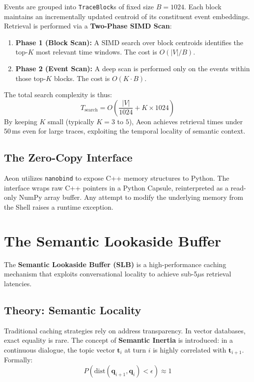\documentclass[10pt,twocolumn]{article}
\begin{document}
Events are grouped into \texttt{TraceBlock}s of fixed size $B=1024$. Each block maintains an incrementally updated centroid of its constituent event embeddings. Retrieval is performed via a \textbf{Two-Phase SIMD Scan}:
\begin{enumerate}
    \item \textbf{Phase 1 (Block Scan):} A SIMD search over block centroids identifies the top-$K$ most relevant time windows. The cost is $O(|V|/B)$.
    \item \textbf{Phase 2 (Event Scan):} A deep scan is performed only on the events within those top-$K$ blocks. The cost is $O(K \cdot B)$.
\end{enumerate}
The total search complexity is thus:
\begin{equation}
    T_{\text{search}} = O\left(\frac{|V|}{1024} + K \times 1024\right)
\end{equation}
By keeping $K$ small (typically $K=3$ to $5$), Aeon achieves retrieval times under 50\,ms even for large traces, exploiting the temporal locality of semantic context.

\subsection{The Zero-Copy Interface}
Aeon utilizes \texttt{nanobind} to expose C++ memory structures to Python. The interface wraps raw C++ pointers in a Python Capsule, reinterpreted as a read-only NumPy array buffer. Any attempt to modify the underlying memory from the Shell raises a runtime exception.

\section{The Semantic Lookaside Buffer}
\label{sec:slb}
\label{sec:slb}

The \textbf{Semantic Lookaside Buffer (SLB)} is a high-performance caching mechanism that exploits conversational locality to achieve sub-5$\mu$s retrieval latencies.

\subsection{Theory: Semantic Locality}
Traditional caching strategies rely on address transparency. In vector databases, exact equality is rare. The concept of \textbf{Semantic Inertia} is introduced: in a continuous dialogue, the topic vector $\mathbf{t}_i$ at turn $i$ is highly correlated with $\mathbf{t}_{i+1}$. Formally:
\[
P\left( \text{dist}(\mathbf{q}_{i+1}, \mathbf{q}_i) < \epsilon \right) \approx 1
\]
\end{document}
